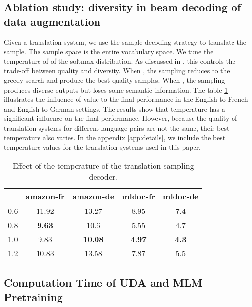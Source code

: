 \documentclass{article} \usepackage{iclr2020_conference,times}
\begin{document}
\subsection{Ablation study: diversity in beam decoding of data augmentation}
\label{app:temp}

Given a translation system, we use the sample decoding strategy to translate the sample. 
The sample space is the entire vocabulary space. We tune the temperature of  of the softmax distribution. 
As discussed in \cite{xie2019unsupervised}, this controls the trade-off between quality and diversity. 
When , the sampling reduces to the greedy search and produce the best quality samples.
When , the sampling produces diverse outputs but loses some semantic information. 
The table \ref{tab:temperature} illustrates the influence of  value to the final performance in the English-to-French and English-to-German settings. 
The results show that temperature has a significant influence on the final performance. 
However, because the quality of translation systems for different language pairs are not the same, their best temperature also varies. 
In the appendix \ref{app:details}, we include the best temperature values for the translation systems used in this paper.  

\begin{table}[!ht]
\centering
    \begin{tabular}{l|cccc}
    \toprule
     & amazon-fr & amazon-de & mldoc-fr & mldoc-de \\
    \midrule
    0.6  & 11.92    & 13.27   & 8.95    & 7.4     \\
    0.8  & \textbf{9.63}     & 10.6    & 5.55    & 4.7     \\
    1.0    & 9.83     & \textbf{10.08}   & \textbf{4.97}    & \textbf{4.3}     \\
    1.2  & 10.83    & 13.58   & 7.87    & 5.5    \\
    \bottomrule
    \end{tabular}
    \label{tab:temperature}
    \caption{Effect of the temperature of the translation sampling decoder.}
\end{table}


\subsection{Computation Time of UDA and MLM Pretraining}
\label{sec:time}
\end{document}
